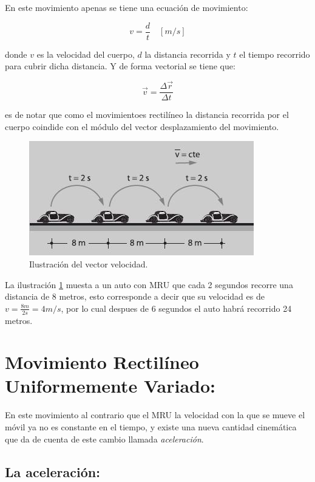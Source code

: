 \documentclass[a5paper,pagesize,10pt,bibtotoc,pointlessnumbers,
normalheadings,DIV=9,fleqn,x11names,table,twoside=false]{scrbook}
\begin{document}
En este movimiento apenas se tiene una ecuación de movimiento:

\begin{equation}
 v = \frac{d}{t}\quad [m/s]
\end{equation}

donde $v$ es la velocidad del cuerpo, $d$ la distancia recorrida y $t$ el tiempo recorrido para cubrir dicha distancia. Y de 
forma vectorial se tiene que:

\begin{equation}
 \vec{v} = \frac{\Delta\vec{r}}{\Delta t}
\end{equation}

es de notar que como el movimientoes rectilíneo la distancia recorrida por el cuerpo coindide con el módulo del vector 
desplazamiento del movimiento.\\
 
\begin{figure}[ht]
 \centering
 \includegraphics[scale=0.8]{images/Movimiento_rectilineo_uniforme.jpg}
 \caption{Ilustración del vector velocidad.}\label{mru}
\end{figure} 
 
La ilustración \ref{mru} muesta a un auto con MRU que cada 2 segundos recorre una distancia de 8 metros, esto  corresponde a 
decir que su velocidad es de $v = \frac{8m}{2s} = 4 m/s$, por lo cual despues de 6 segundos el auto habrá recorrido 24 metros.

\section{Movimiento Rectilíneo Uniformemente Variado:}
 
En este movimiento al contrario que el MRU la velocidad con la que se mueve el móvil ya no es constante en el tiempo, y existe 
una nueva cantidad cinemática que da de cuenta de este cambio llamada \textit{aceleración}. 

\subsection{La aceleración:}
\end{document}

